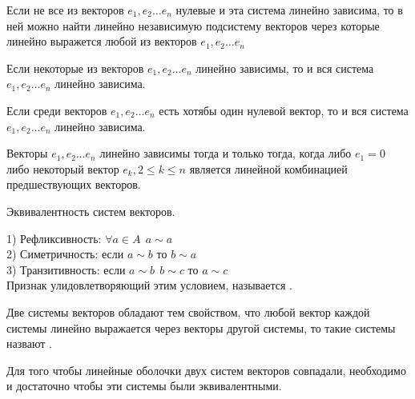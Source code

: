 \begin{theorem}
  Если не все из векторов $e_1, e_2 \ldots e_n$ нулевые и эта система линейно
зависима, то в ней можно найти линейно независимую подсистему векторов через
которые линейно выражется любой из векторов $e_1, e_2 \ldots e_n$
\end{theorem}

\begin{theorem}
  Если некоторые из векторов $e_1, e_2 \ldots e_n$ линейно зависимы, то и вся
система $e_1, e_2 \ldots e_n$ линейно зависима.
\end{theorem}

\begin{theorem}
  Если среди векторов $e_1, e_2 \ldots e_n$ есть хотябы один нулевой вектор,
то и вся система $e_1, e_2 \ldots e_n$ линейно зависима.
\end{theorem}

\begin{theorem}
  Векторы $e_1, e_2 \ldots e_n$ линейно зависимы тогда и только тогда, когда
либо $e_1 = 0$ либо некоторый вектор $e_k, 2 \le k \le n$ является линейной
комбинацией предшествующих векторов.
\end{theorem}

\begin{title}[\Large]
  Эквивалентность систем векторов.
\end{title}

\begin{defin}
  1) Рефликсивность: $\forall a \in A ~~ a \sim a$\\
  2) Симетричность: если $a \sim b$ то $b \sim a$\\
  3) Транзитивность: если $a \sim b ~~ b \sim c$ то $a \sim c$\\
Признак улидовлетворяющий этим условием, называется
.
\end{defin}

\begin{defin}
  Две системы векторов обладают тем свойством, что любой вектор каждой системы
линейно выражается через векторы другой системы, то такие системы назвают
.
\end{defin}

\begin{theorem}
  Для того чтобы линейные оболочки двух систем векторов совпадали, необходимо и
достаточно чтобы эти системы были эквивалентными.
\end{theorem}

